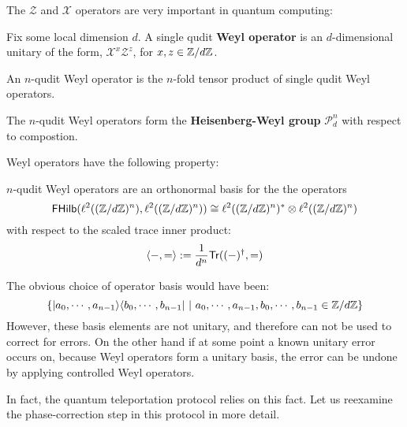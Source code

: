 The $\mathcal Z$ and $\mathcal X$ operators are very important in quantum computing:
\begin{definition}
\label{definition:begin}
Fix some local dimension $d$.
A single qudit {\bf Weyl operator} is an $d$-dimensional unitary of the form, $\mathcal{X}^{x}\mathcal{Z}^{z}$, for $x,z \in \mathbb{Z}/d\mathbb{Z}$.

An $n$-qudit Weyl operator is the $n$-fold tensor product of single qudit Weyl operators.

The $n$-qudit Weyl operators form the {\bf Heisenberg-Weyl group} $\mathcal{P}_d^n$ with respect to compostion.\end{definition}
Weyl operators have the following property:
\begin{lemma}
\label{lem:ueb}
$n$-qudit Weyl operators are an orthonormal basis for the the operators
$$
\mathsf{FHilb}(\ell^2((\mathbb{Z}/d\mathbb{Z})^n), \ell^2((\mathbb{Z}/d\mathbb{Z})^n))
\cong \ell^2((\mathbb{Z}/d\mathbb{Z})^n)^*\otimes \ell^2((\mathbb{Z}/d\mathbb{Z})^n)
$$
with respect to the scaled trace inner product:
$$
\langle  -,= \rangle
:=
\dfrac{1}{d^n}\mathsf{Tr}((-)^\dag,=)
$$
\end{lemma}
The obvious choice of operator basis would have been:
$$
\{ |a_0, \cdots, a_{n-1} \rangle \langle  b_0,\cdots, b_{n-1} | \ | \ a_0,\cdots, a_{n-1},b_0,\cdots, b_{n-1} \in \mathbb{Z}/d\mathbb{Z} \}
$$
However, these basis elements are not unitary, and therefore can not be used to correct for errors.
On the other hand if at some point a known unitary error occurs on,  because Weyl operators form a unitary basis, the error can be undone by applying controlled Weyl operators.

In fact, the quantum teleportation protocol relies on this fact.
Let us reexamine the phase-correction step in this protocol in more detail.

